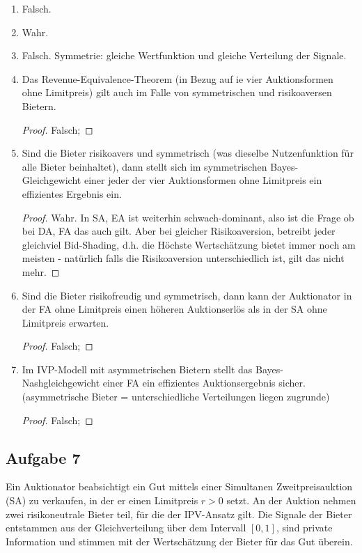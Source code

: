 \documentclass[12pt]{extreport} %
\theoremstyle{named}
\theoremstyle{itshape}
\theoremstyle{normal}
\begin{document}
\begin{enumerate}
		\begin{proof}
			Wahr; wenn wegen $r^{*} - x_{0}$ das Gut nicht verkauft wird, also wegen dem Zuschlag des Reservationspreises, ergibt sich ein ineffizientes Ergebnis.
		\end{proof}
	\item Falsch.
	\item Wahr.
	\item Falsch. Symmetrie: gleiche Wertfunktion und gleiche Verteilung der Signale.
	\item Das Revenue-Equivalence-Theorem (in Bezug auf ie vier Auktionsformen ohne Limitpreis) gilt auch im Falle von symmetrischen und risikoaversen Bietern.
		\begin{proof}
			Falsch;
		\end{proof}
	\item Sind die Bieter risikoavers und symmetrisch (was dieselbe Nutzenfunktion für alle Bieter beinhaltet), dann stellt sich im symmetrischen Bayes-Gleichgewicht einer jeder der vier Auktionsformen ohne Limitpreis ein effizientes Ergebnis ein.
		\begin{proof}
			 Wahr. In SA, EA ist weiterhin schwach-dominant, also ist die Frage ob bei DA, FA das auch gilt. Aber bei gleicher Risikoaversion, betreibt jeder gleichviel Bid-Shading, d.h. die Höchste Wertschätzung bietet immer noch am meisten - natürlich falls die Risikoaversion unterschiedlich ist, gilt das nicht mehr.
		\end{proof}
	\item Sind die Bieter risikofreudig und symmetrisch, dann kann der Auktionator in der FA ohne Limitpreis einen höheren Auktionserlös als in der SA ohne Limitpreis erwarten.
		\begin{proof}
			Falsch; 
		\end{proof}
	\item Im IVP-Modell mit asymmetrischen Bietern stellt das Bayes-Nashgleichgewicht einer FA ein effizientes Auktionsergebnis sicher. (asymmetrische Bieter = unterschiedliche Verteilungen liegen zugrunde)
		\begin{proof}
			Falsch;
		\end{proof}
\end{enumerate}

\subsection*{Aufgabe 7}

Ein Auktionator beabsichtigt ein Gut mittels einer Simultanen Zweitpreisauktion (SA) zu verkaufen, in der er einen Limitpreis $r > 0$ setzt. An der Auktion nehmen zwei risikoneutrale Bieter teil, für die der IPV-Ansatz gilt. Die Signale der Bieter entstammen aus der Gleichverteilung über dem Intervall $[0, 1]$, sind private Information und stimmen mit der Wertschätzung der Bieter für das Gut überein.
\end{document}
